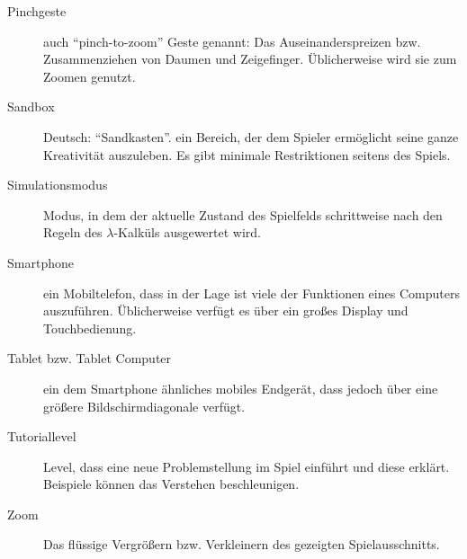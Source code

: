\begin{description}
	\item [Pinchgeste]auch "`pinch-to-zoom"' Geste genannt: Das Auseinanderspreizen bzw. Zusammenziehen von Daumen und Zeigefinger. Üblicherweise wird sie zum Zoomen genutzt.
	\item [Sandbox] Deutsch: "`Sandkasten"'. ein Bereich, der dem Spieler ermöglicht seine ganze Kreativität auszuleben. Es gibt minimale Restriktionen seitens des Spiels.
	\item[Simulationsmodus] Modus, in dem der aktuelle Zustand des Spielfelds schrittweise nach den Regeln des \(\lambda\)-Kalküls ausgewertet wird.
	\item[Smartphone] ein Mobiltelefon, dass in der Lage ist viele der Funktionen eines Computers auszuführen. Üblicherweise verfügt es über ein großes Display und Touchbedienung.
	\item[Tablet bzw. Tablet Computer] ein dem Smartphone ähnliches mobiles Endgerät, dass jedoch über eine größere Bildschirmdiagonale verfügt.
	\item[Tutoriallevel] Level, dass eine neue Problemstellung im Spiel einführt und diese erklärt. Beispiele können das Verstehen beschleunigen.
	\item[Zoom] Das flüssige Vergrößern bzw. Verkleinern des gezeigten Spielausschnitts.
\end{description}
